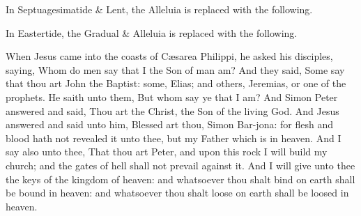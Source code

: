 
\begin{rubric}
	In Septuagesimatide \& Lent, the Alleluia is replaced with the following.
\end{rubric}


\begin{rubric}
	In Eastertide, the Gradual \& Alleluia is replaced with the following.
\end{rubric}


 When Jesus came into the coasts of C{\ae}sarea Philippi, he asked his disciples, saying, Whom do men say that I the Son of man am? And they said, Some say that thou art John the Baptist: some, Elias; and others, Jeremias, or one of the prophets. He saith unto them, But whom say ye that I am? And Simon Peter answered and said, Thou art the Christ, the Son of the living God. And Jesus answered and said unto him, Blessed art thou, Simon Bar-jona: for flesh and blood hath not revealed it unto thee, but my Father which is in heaven. And I say also unto thee, That thou art Peter, and upon this rock I will build my church; and the gates of hell shall not prevail against it. And I will give unto thee the keys of the kingdom of heaven: and whatsoever thou shalt bind on earth shall be bound in heaven: and whatsoever thou shalt loose on earth shall be loosed in heaven.


